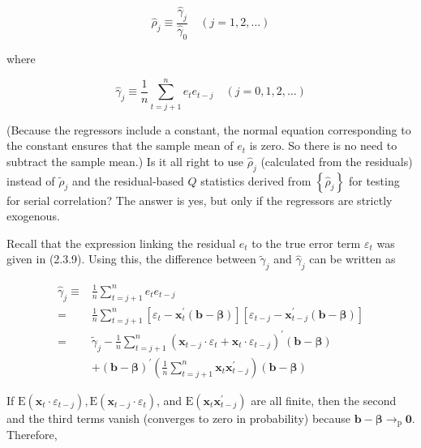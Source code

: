 \documentclass[10pt]{article}
\begin{document}
\begin{equation*}
\hat{\rho}_{j} \equiv \frac{\hat{\gamma}_{j}}{\hat{\gamma}_{0}} \quad(j=1,2, \ldots) \tag{2.10.8}
\end{equation*}


where


\begin{equation*}
\hat{\gamma}_{j} \equiv \frac{1}{n} \sum_{t=j+1}^{n} e_{t} e_{t-j} \quad(j=0,1,2, \ldots) \tag{2.10.9}
\end{equation*}


(Because the regressors include a constant, the normal equation corresponding to the constant ensures that the sample mean of $e_{t}$ is zero. So there is no need to subtract the sample mean.) Is it all right to use $\hat{\rho}_{j}$ (calculated from the residuals) instead of $\tilde{\rho}_{j}$ and the residual-based $Q$ statistics derived from $\left\{\hat{\rho}_{j}\right\}$ for testing for serial correlation? The answer is yes, but only if the regressors are strictly exogenous.

Recall that the expression linking the residual $e_{t}$ to the true error term $\varepsilon_{t}$ was given in (2.3.9). Using this, the difference between $\tilde{\gamma}_{j}$ and $\hat{\gamma}_{j}$ can be written as


\begin{align*}
\hat{\gamma}_{j} \equiv & \frac{1}{n} \sum_{t=j+1}^{n} e_{t} e_{t-j} \\
= & \frac{1}{n} \sum_{t=j+1}^{n}\left[\varepsilon_{t}-\mathbf{x}_{t}^{\prime}(\mathbf{b}-\boldsymbol{\beta})\right]\left[\varepsilon_{t-j}-\mathbf{x}_{t-j}^{\prime}(\mathbf{b}-\boldsymbol{\beta})\right] \\
= & \tilde{\gamma}_{j}-\frac{1}{n} \sum_{t=j+1}^{n}\left(\mathbf{x}_{t-j} \cdot \varepsilon_{t}+\mathbf{x}_{t} \cdot \varepsilon_{t-j}\right)^{\prime}(\mathbf{b}-\boldsymbol{\beta}) \\
& +(\mathbf{b}-\boldsymbol{\beta})^{\prime}\left(\frac{1}{n} \sum_{t=j+1}^{n} \mathbf{x}_{t} \mathbf{x}_{t-j}^{\prime}\right)(\mathbf{b}-\boldsymbol{\beta}) \tag{2.10.10}
\end{align*}


If $\mathrm{E}\left(\mathbf{x}_{t} \cdot \varepsilon_{t-j}\right), \mathrm{E}\left(\mathbf{x}_{t-j} \cdot \varepsilon_{t}\right)$, and $\mathrm{E}\left(\mathbf{x}_{t} \mathbf{x}_{t-j}^{\prime}\right)$ are all finite, then the second and the third terms vanish (converges to zero in probability) because $\mathbf{b}-\boldsymbol{\beta} \rightarrow_{\mathrm{p}} \mathbf{0}$. Therefore,
\end{document}

